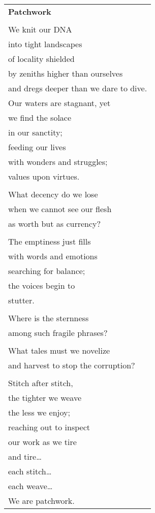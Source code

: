 \documentclass{article}
\begin{document}
\begin{center}
\begin{tabular}{l}
\textbf{Patchwork} \\
\\
We knit our DNA \\
into tight landscapes \\
of locality shielded \\
by zeniths higher than ourselves \\ %
and dregs deeper than we dare to dive. \\ %
Our waters are stagnant, yet \\
we find the solace \\
in our sanctity; \\
feeding our lives \\
with wonders and struggles; \\
values upon virtues. \\
\\
What decency do we lose \\
when we cannot see our flesh \\
as worth but as currency? \\
\\
The emptiness just fills \\
with words and emotions \\
searching for balance; \\
the voices begin to \\
stutter. \\
\\
Where is the sternness \\
among such fragile phrases? \\
\\
What tales must we novelize \\
and harvest to stop the corruption? \\
\\
Stitch after stitch, \\
the tighter we weave \\
the less we enjoy; \\
reaching out to inspect \\
our work as we tire \\
and tire\ldots \\
each stitch\ldots \\
each weave\ldots \\
We are patchwork. \\
\end{tabular}
\end{center}
\end{document}
